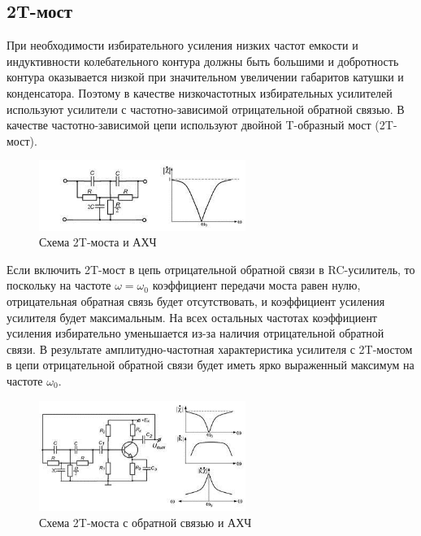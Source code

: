 \documentclass[unicode, 12pt, a4paper, oneside]{article}
\begin{document}
\subsection*{2T-мост}

При необходимости избирательного усиления низких частот емкости и индуктивности колебательного контура должны быть большими и добротность контура оказывается низкой при значительном увеличении габаритов катушки и конденсатора. Поэтому в качестве низкочастотных избирательных усилителей используют усилители с частотно-зависимой отрицательной обратной связью. В качестве частотно-зависимой цепи используют двойной T-образный мост (2T-мост).

\begin{figure}[H]
\centering
\includegraphics[width=0.6\textwidth]{7_2T.jpg}
\caption{Схема 2T-моста и АХЧ}
\label{fig:7_2T}
\end{figure}

Если включить 2T-мост в цепь отрицательной обратной связи в RC-усилитель, то поскольку на частоте $\omega = \omega_{0}$ коэффициент передачи моста равен нулю, отрицательная обратная связь будет отсутствовать, и коэффициент усиления усилителя будет максимальным. На всех остальных частотах коэффициент усиления избирательно уменьшается из-за наличия отрицательной обратной связи. В результате амплитудно-частотная характеристика усилителя с 2T-мостом в цепи отрицательной обратной связи будет иметь ярко выраженный максимум на частоте $\omega_{0}$.

\begin{figure}[H]
\centering
\includegraphics[width=0.6\textwidth]{7_2T_with_feedback.jpg}
\caption{Схема 2T-моста с обратной связью и АХЧ}
\label{fig:7_2T_with_feedback}
\end{figure}
\end{document}
